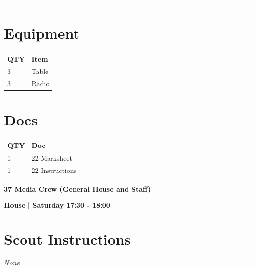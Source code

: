 \documentclass[10pt]{article}
\newcommand{\newtitle}[1]{\begin{center}{\Huge\bfseries #1 }\\ \vspace{5mm}\end{center}}
\newcommand{\newsubtitle}[1]{\begin{center}{\color{grey}\Large\bfseries #1 }\\ \vspace{5mm}\end{center}}
\begin{document}
			\vspace{0.5cm}
	\hrule
	\vspace{0.5cm}

	\begin{multicols}{2}

		\section*{\faWrench \: Equipment}

		
	\begin{center}
			\begin{tabular}{p{2cm}p{4cm}}


				\textbf{QTY} & \textbf{Item} \\\toprule
												3&Table\\\midrule
												3&Radio\\\midrule
								\end{tabular}

			\end{center}

		
		\vfill\null
		\columnbreak

			\section*{\faFile \: Docs}
		 	\begin{center}
			\begin{tabular}{p{2cm}p{4cm}}

			\textbf{QTY} & \textbf{Doc} \\\toprule
										1&22-Marksheet\\\midrule
										1&22-Instructions\\\midrule
							\end{tabular}
			\end{center}
	

		\vfill\null

		\end{multicols}



	\vspace{1cm}


	\clearpage
		\newtitle{37 Media Crew (General House and Staff) }
	\newsubtitle{House | Saturday 17:30 - 18:00}
		\setcounter{section}{36}
	\section*{Scout Instructions}
		\textit{None}
	
\end{document}
